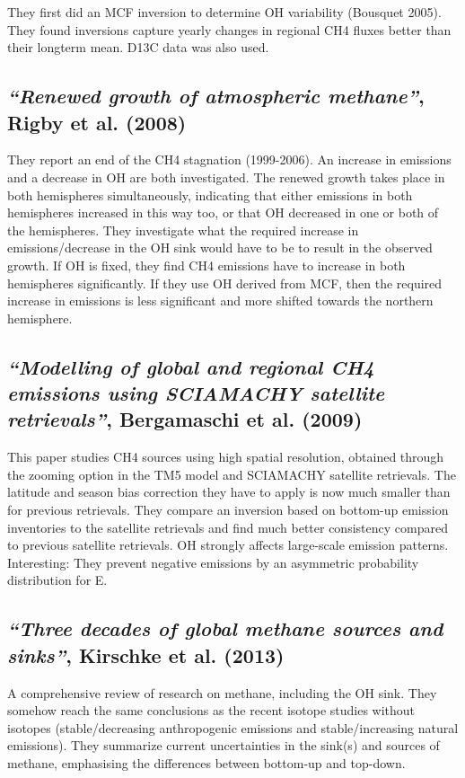 \documentclass{article}
\begin{document}
They first did an MCF inversion to determine OH variability (Bousquet 2005). They found inversions capture yearly changes in regional CH4 fluxes better than their longterm mean. D13C data was also used.

\subsection{\textit{“Renewed growth of atmospheric methane”}, Rigby et al. (2008)}
They report an end of the CH4 stagnation (1999-2006). An increase in emissions and a decrease in OH are both investigated. The renewed growth takes place in both hemispheres simultaneously, indicating that either emissions in both hemispheres increased in this way too, or that OH decreased in one or both of the hemispheres.
They investigate what the required increase in emissions/decrease in the OH sink would have to be to result in the observed growth. If OH is fixed, they find CH4 emissions have to increase in both hemispheres significantly. If they use OH derived from MCF, then the required increase in emissions is less significant and more shifted towards the northern hemisphere.

\subsection{\textit{“Modelling of global and regional CH4 emissions using SCIAMACHY satellite retrievals”}, Bergamaschi et al. (2009)}
This paper studies CH4 sources using high spatial resolution, obtained through the zooming option in the TM5 model and SCIAMACHY satellite retrievals. The latitude and season bias correction they have to apply is now much smaller than for previous retrievals. They compare an inversion based on bottom-up emission inventories to the satellite retrievals and find much better consistency compared to previous satellite retrievals. OH strongly affects large-scale emission patterns. Interesting: They prevent negative emissions by an asymmetric probability distribution for E.

\subsection{\textit{“Three decades of global methane sources and sinks”}, Kirschke et al. (2013)}
A comprehensive review of research on methane, including the OH sink. They somehow reach the same conclusions as the recent isotope studies without isotopes (stable/decreasing anthropogenic emissions and stable/increasing natural emissions). They summarize current uncertainties in the sink(s) and sources of methane, emphasising the differences between bottom-up and top-down.
\end{document}
